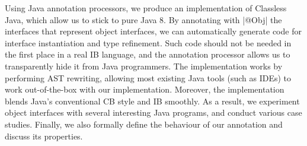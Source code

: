 





Using Java annotation processors, we produce an implementation of
Classless Java, which allow us to stick to pure Java 8. By annotating
with \Q|@Obj| the interfaces that represent object interfaces, we can
automatically generate code for interface instantiation and
type refinement. Such code should not be needed in the first place in
a real IB language, and the annotation processor allows us to
transparently hide it from Java programmers.  The implementation works
by performing AST rewriting, allowing most existing Java tools (such as
IDEs) to work out-of-the-box with our implementation. Moreover, the
implementation blends Java's conventional CB style and IB smoothly.
As a result, we experiment object interfaces with several interesting
Java programs, and conduct various case studies.  Finally, we also
formally define the behaviour of our \mixin annotation and discuss
its properties.



%



